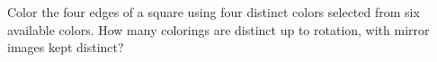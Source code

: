 Color the four edges of a square using four distinct colors selected from six available colors. How many colorings are distinct up to rotation, with mirror images kept distinct?

